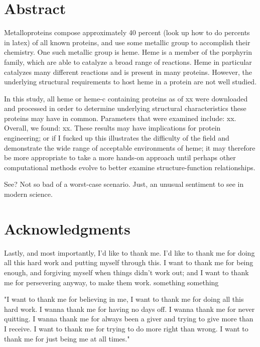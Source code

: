 \documentclass[12pt,oneside,a4paper]{report}
\begin{document}
	
	
	\chapter*{Abstract}
		Metalloproteins compose approximately 40 percent (look up how to do percents in latex) of all known proteins, and use some metallic group to accomplish their chemistry. One such metallic group is heme. Heme is a member of the porphyrin family, which are able to catalyze a broad range of reactions. Heme in particular catalyzes many different reactions and is present in many proteins. However, the underlying structural requirements to host heme in a protein are not well studied.
		
		In this study, all heme or heme-c containing proteins as of xx were downloaded and processed in order to determine underlying structural characteristics these proteins may have in common. Parameters that were examined include: xx. Overall, we found: xx. These results may have implications for protein engineering; or if I fucked up this illustrates the difficulty of the field and demonstrate the wide range of acceptable environments of heme; it may therefore be more appropriate to take a more hands-on approach until perhaps other computational methods evolve to better examine structure-function relationships.
		
		See? Not so bad of a worst-case scenario. Just, an unusual sentiment to see in modern science.
		
	
	
	
	
	
	\chapter*{Acknowledgments}
		Lastly, and most importantly, I'd like to thank me. I'd like to thank me for doing all this hard work and putting myself through this. I want to thank me for being enough, and forgiving myself when things didn't work out; and I want to thank me for persevering anyway, to make them work.
		something something \cite{Cooper2019}
		
		
		"I want to thank me for believing in me, I want to thank me for doing all this hard work. I wanna thank me for having no days off. I wanna thank me for never quitting. I wanna thank me for always been a giver and trying to give more than I receive. I want to thank me for trying to do more right than wrong. I want to thank me for just being me at all times."
		
\end{document}
